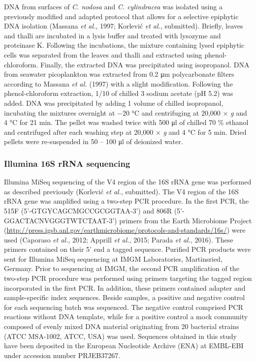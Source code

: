 \documentclass[12pt,]{article}
\begin{document}
DNA from surfaces of \emph{C. nodosa} and \emph{C. cylindracea} was
isolated using a previously modified and adapted protocol that allows
for a selective epiphytic DNA isolation (Massana \emph{et al.}, 1997;
Korlević \emph{et al.}, submitted). Briefly, leaves and thalli are
incubated in a lysis buffer and treated with lysozyme and proteinase K.
Following the incubations, the mixture containing lysed epiphytic cells
was separated from the leaves and thalli and extracted using
phenol-chloroform. Finally, the extracted DNA was precipitated using
isopropanol. DNA from seawater picoplankton was extracted from 0.2
\si{\um} polycarbonate filters according to Massana \emph{et al.} (1997)
with a slight modification. Following the phenol-chloroform extraction,
1/10 of chilled 3 \si{\Molar} sodium acetate (pH 5.2) was added. DNA was
precipitated by adding 1 volume of chilled isopropanol, incubating the
mixtures overnight at \num{-20} \si{\degreeCelsius} and centrifuging at
20,000 × \emph{g} and 4 \si{\degreeCelsius} for 21 \si{\minute}. The
pellet was washed twice with 500 \si{\ul} of chilled 70 \si{\percent}
ethanol and centrifuged after each washing step at 20,000 × \emph{g} and
4 \si{\degreeCelsius} for 5 \si{\minute}. Dried pellets were
re-suspended in 50 -- 100 \si{\ul} of deionized water.

\hypertarget{illumina-16s-rrna-sequencing}{%
\subsubsection{Illumina 16S rRNA
sequencing}\label{illumina-16s-rrna-sequencing}}

Illumina MiSeq sequencing of the V4 region of the 16S rRNA gene was
performed as described previously (Korlević \emph{et al.}, submitted).
The V4 region of the 16S rRNA gene was amplified using a two-step PCR
procedure. In the first PCR, the 515F (5'-GTGYCAGCMGCCGCGGTAA-3') and
806R (5'-GGACTACNVGGGTWTCTAAT-3') primers from the Earth Microbiome
Project
(\url{http://press.igsb.anl.gov/earthmicrobiome/protocols-and-standards/16s/})
were used (Caporaso \emph{et al.}, 2012; Apprill \emph{et al.}, 2015;
Parada \emph{et al.}, 2016). These primers contained on their 5' end a
tagged sequence. Purified PCR products were sent for Illumina MiSeq
sequencing at IMGM Laboratories, Martinsried, Germany. Prior to
sequencing at IMGM, the second PCR amplification of the two-step PCR
procedure was performed using primers targeting the tagged region
incorporated in the first PCR. In addition, these primers contained
adapter and sample-specific index sequences. Beside samples, a positive
and negative control for each sequencing batch was sequenced. The
negative control comprised PCR reactions without DNA template, while for
a positive control a mock community composed of evenly mixed DNA
material originating from 20 bacterial strains (ATCC MSA-1002, ATCC,
USA) was used. Sequences obtained in this study have been deposited in
the European Nucleotide Archive (ENA) at EMBL-EBI under accession number
PRJEB37267.
\end{document}

